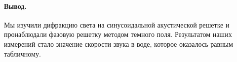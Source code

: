 \documentclass[12pt]{article}
\begin{document}
\paragraph{Вывод.} 

Мы изучили дифракцию света на синусоидальной акустической решетке и пронаблюдали фазовую решетку методом темного поля. Результатом наших измерений стало значение скорости звука в воде, которое оказалось равным табличному.
\end{document}
